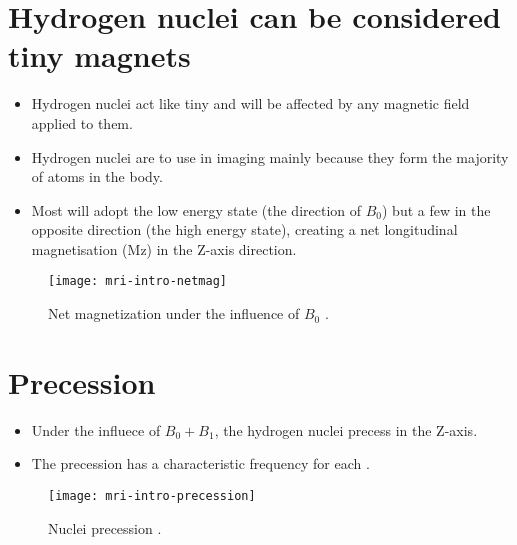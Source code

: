 \section{Hydrogen nuclei can be considered tiny magnets}
\begin{itemize}
\item Hydrogen nuclei act like tiny  and will be affected by any magnetic field
  applied to them.
\item Hydrogen nuclei are  to use in imaging mainly because they form the
  majority of atoms in the body.
\item Most will adopt the low energy state (the direction of $B_0$)
  but a few in the opposite direction (the high energy state),
  creating a net longitudinal magnetisation (Mz) in the Z-axis
  direction.
\end{itemize}
\vspace{-4ex}
\begin{figure}[!b]
  \centering
  \texttt{[image: mri-intro-netmag]}
  \caption{Net magnetization under the influence of $B_0$ \cite{abdulla2025MRI_intro}.}
  \label{fig:MRI-intro-netmag}
\end{figure}

\section{Precession}
\begin{itemize}
\item Under the influece of $B_0+B_1$, the hydrogen nuclei precess in the Z-axis.
\item The precession has a characteristic 
  frequency for each .
\end{itemize}
\vspace{-4ex}
\begin{figure}[!b]
  \centering
  \texttt{[image: mri-intro-precession]}
  \caption{Nuclei precession \cite{abdulla2025MRI_intro}.}
  \label{fig:MRI-intro-precession}
\end{figure}

